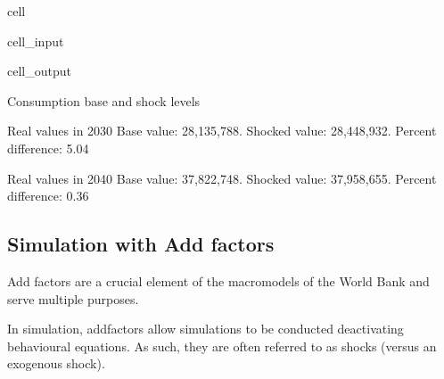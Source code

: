 \documentclass[letterpaper,10pt,english]{jupyterBook}
\begin{document}
\begin{sphinxuseclass}{cell}
\begin{sphinxVerbatimInput}
\begin{sphinxuseclass}{cell_input}
\begin{sphinxVerbatim}[commandchars=\\\{\}]
    \PYG{p}{[}\PYG{p}{]}\PYG{p}{[}\PYG{p}{]}\PYG{p}{[}\PYG{p}{]}
\end{sphinxVerbatim}

\end{sphinxuseclass}\end{sphinxVerbatimInput}
\begin{sphinxVerbatimOutput}

\begin{sphinxuseclass}{cell_output}
\begin{sphinxVerbatim}[commandchars=\\\{\}]
Consumption base and shock levels

Real values in 2030
Base value:  28,135,788.	Shocked value: 28,448,932.
Percent difference: 5.04

Real values in 2040
Base value:  37,822,748.	Shocked value: 37,958,655.
Percent difference: 0.36
\end{sphinxVerbatim}

\end{sphinxuseclass}\end{sphinxVerbatimOutput}

\end{sphinxuseclass}

\subsection{Simulation with Add factors}
\label{\detokenize{content/06_WBModels/ScenarioAnalysis:simulation-with-add-factors}}
\sphinxAtStartPar
Add factors are a crucial element of the macromodels of the World Bank and serve multiple purposes.

\sphinxAtStartPar
In simulation, add\sphinxhyphen{}factors allow simulations to be conducted  de\sphinxhyphen{}activating behavioural equations.  As such, they are often referred to as  shocks (versus an exogenous shock).
\end{document}
